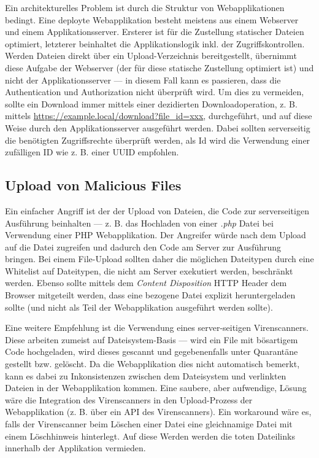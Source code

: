 Ein architekturelles Problem ist durch die Struktur von Webapplikationen bedingt. Eine deployte Webapplikation besteht meistens aus einem Webserver und einem Applikationsserver. Ersterer ist für die Zustellung statischer Dateien optimiert, letzterer beinhaltet die Applikationslogik inkl. der Zugriffskontrollen. Werden Dateien direkt über ein Upload-Verzeichnis bereitgestellt, übernimmt diese Aufgabe der Webserver (der für diese statische Zustellung optimiert ist) und nicht der Applikationsserver --- in diesem Fall kann es passieren, dass die Authentication und Authorization nicht überprüft wird. Um dies zu vermeiden, sollte ein Download immer mittels einer dezidierten Downloadoperation, z. B. mittels \url{https://example.local/download?file_id=xxx}, durchgeführt, und auf diese Weise durch den Applikationsserver ausgeführt werden. Dabei sollten serverseitig die benötigten Zugriffsrechte überprüft werden, als Id wird die Verwendung einer zufälligen ID wie z. B. einer UUID empfohlen.

\subsection{Upload von Malicious Files}

Ein einfacher Angriff ist der der Upload von Dateien, die Code zur serverseitigen Ausführung beinhalten --- z. B. das Hochladen von einer \textit{.php} Datei bei Verwendung einer PHP Webapplikation. Der Angreifer würde nach dem Upload auf die Datei zugreifen und dadurch den Code am Server zur Ausführung bringen. Bei einem File-Upload sollten daher die möglichen Dateitypen durch eine Whitelist auf Dateitypen, die nicht am Server exekutiert werden, beschränkt werden. Ebenso sollte mittels dem \textit{Content Disposition} HTTP Header dem Browser mitgeteilt werden, dass eine bezogene Datei explizit heruntergeladen sollte (und nicht als Teil der Webapplikation ausgeführt werden sollte).

Eine weitere Empfehlung ist die Verwendung eines server-seitigen Virenscanners. Diese arbeiten zumeist auf Dateisystem-Basis --- wird ein File mit bösartigem Code hochgeladen, wird dieses gescannt und gegebenenfalls unter Quarantäne gestellt bzw. gelöscht. Da die Webapplikation dies nicht automatisch bemerkt, kann es dabei zu Inkonsistenzen zwischen dem Dateisystem und verlinkten Dateien in der Webapplikation kommen. Eine saubere, aber aufwendige, Lösung wäre die Integration des Virenscanners in den Upload-Prozess der Webapplikation (z. B. über ein API des Virenscanners). Ein workaround wäre es, falls der Virenscanner beim Löschen einer Datei eine gleichnamige Datei mit einem Löschhinweis hinterlegt. Auf diese Werden werden die toten Dateilinks innerhalb der Applikation vermieden.

